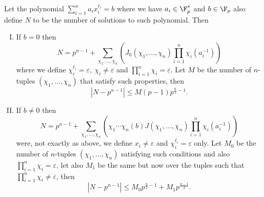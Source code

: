\begin{theorem}\label{thm: fermat generalization}
    Let the polynomial \(\sum_{i=1}^{n} a_i x_i^{\ell_i} = b \) where we have
    \(a_i \in \F_p^\ast\) and \(b \in \F_p\) also define \(N\) to be the number
    of solutions to such polynomial. Then
    \begin{enumerate}[I.]
        \item If \(b = 0\) then
              \[
                  N = p^{n-1} + \sum_{\chi_1,\dots,\chi_n} \left(
                  J_0(\chi_1,\dots,\chi_n) \prod_{i=1}^{n} \chi_i(a_i^{-1}) \right)
              \]
              where we define \(\chi_i^{\ell_i} = \varepsilon,\ \chi_i \neq
              \varepsilon\) and \(\prod_{i=1}^{n} \chi_i = \varepsilon\). Let \(M\)
              be the number of \(n\)-tuples \((\chi_1,\dots,\chi_n)\) that satisfy
              such properties, then
              \[
                  |N - p^{n-1}| \leqslant M(p-1) p^{\frac{n}{2} - 1}.
              \]
        \item If \(b \neq 0\) then
              \[
                  N = p^{n-1} + \sum_{\chi_1, \dots, \chi_n} \left(
                  \chi_1\cdots\chi_n(b) J(\chi_1,\dots,\chi_n) \prod_{i =1}^n
                  \chi_i(a_i^{-1}) \right)
              \]
              were, not exactly as above, we define \(x_i \neq  \varepsilon\) and
              \(\chi_i^{\ell_i} = \varepsilon\) only. Let \(M_0\) be the number of
              \(n\)-tuples \((\chi_1,\dots,\chi_n)\) satisfying such conditions and
              also \(\prod_{i=1}^{n}\chi_i = \varepsilon\), let also \(M_1\) be the
              same but now over the tuples such that \(\prod_{i=1}^n \chi_i \neq
              \varepsilon\), then
              \[
                  |N-p^{n-1}| \leqslant M_0 p^{\frac{n}{2} -1}  + M_1
                  p^{\frac{n-1}{2}}.
              \]
    \end{enumerate}
\end{theorem}
